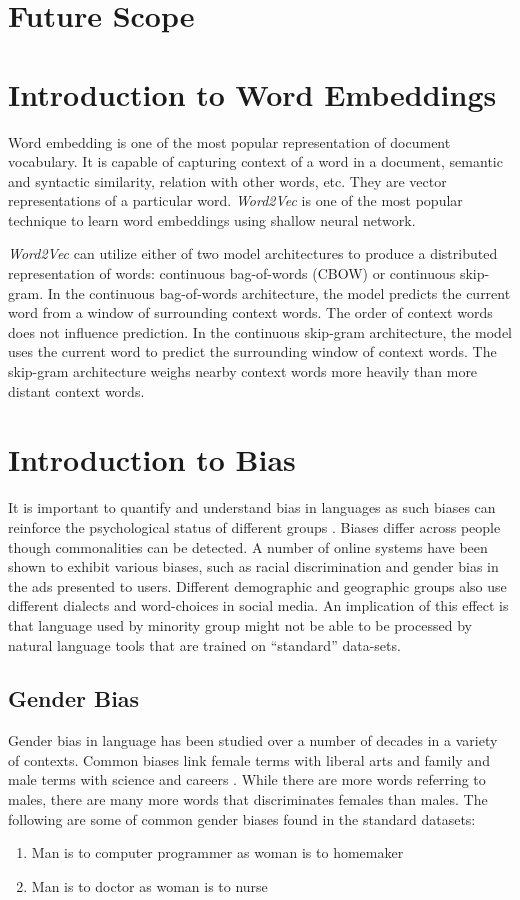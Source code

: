 \documentclass[12pt, a4paper]{article}
\begin{document}
		
	\section{Future Scope}
		
		
	
	\section{Introduction to Word Embeddings}
		Word embedding is one of the most popular representation of document vocabulary. It is capable of capturing context of a word in a document, semantic and syntactic similarity, relation with other words, etc. They are vector representations of a particular word. \emph{Word2Vec} is one of the most popular technique to learn word embeddings using shallow neural network. 
		\par
		\emph{Word2Vec} can utilize either of two model architectures to produce a distributed representation of words: continuous bag-of-words (CBOW) or continuous skip-gram. In the continuous bag-of-words architecture, the model predicts the current word from a window of surrounding context words. The order of context words does not influence prediction. In the continuous skip-gram architecture, the model uses the current word to predict the surrounding window of context words. The skip-gram architecture weighs nearby context words more heavily than more distant context words.
	
	\section{Introduction to Bias}
		It is important to quantify and understand bias in languages as such biases can reinforce the psychological status of different groups \cite{4}. Biases differ across people though commonalities can be detected. A number of online systems have been shown to exhibit various biases, such as racial discrimination and gender bias in the ads presented to users. Different demographic and geographic groups also use different dialects and word-choices in social media. An implication of this effect is that language used by minority group might not be able to be processed by natural language tools that are trained on ``standard” data-sets.
		
		\subsection{Gender Bias}
			Gender bias in language has been studied over a number of decades in a variety of contexts. Common biases link female terms with liberal arts and family and male terms with science and careers \cite{3}. While there are more words referring to males, there are many more words that discriminates females than males. The following are some of common gender biases found in the standard datasets:
			\begin{enumerate}
				\item Man is to computer programmer as woman is to homemaker
				\item Man is to doctor as woman is to nurse
			\end{enumerate}
			
\end{document}
